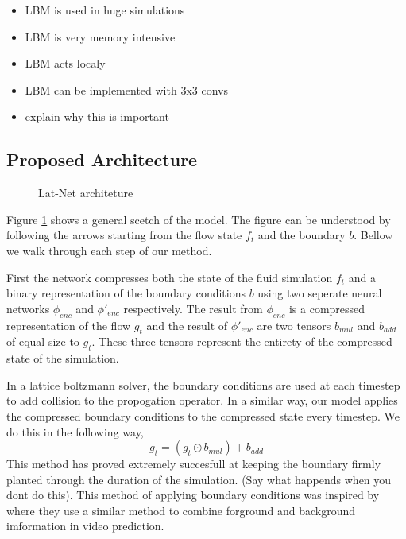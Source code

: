 \documentclass{article}
\begin{document}
\begin{itemize}
  \item LBM is used in huge simulations
  \item LBM is very memory intensive
  \item LBM acts localy
  \item LBM can be implemented with 3x3 convs
  \item explain why this is important
\end{itemize}

\subsection{Proposed Architecture}

\begin{figure}[!t]
\centering
{}
\caption{Lat-Net architeture }
\label{fig_1}
\end{figure}

Figure \ref{fig_1} shows a general scetch of the model. The figure can be understood by following the arrows starting from the flow state $f_t$ and the boundary $b$. Bellow we walk through each step of our method.

First the network compresses both the state of the fluid simulation $f_t$ and a binary representation of the boundary conditions $b$ using two seperate neural networks $\phi_{enc}$ and $\phi'_{enc}$ respectively. The result from $\phi_{enc}$ is a compressed representation of the flow $g_t$ and the result of $\phi'_{enc}$ are two tensors $b_{mul}$ and $b_{add}$ of equal size to $g_t$. These three tensors represent the entirety of the compressed state of the simulation.

In a lattice boltzmann solver, the boundary conditions are used at each timestep to add collision to the propogation operator. In a similar way, our model applies the compressed boundary conditions to the compressed state every timestep. We do this in the following way,
\begin{equation}
  g_t = (g_t \odot b_{mul}) + b_{add}
\end{equation}
This method has proved extremely succesfull at keeping the boundary firmly planted through the duration of the simulation. (Say what happends when you dont do this). This method of applying boundary conditions was inspired by\cite{vondrick2016generating} where they use a similar method to combine forground and background imformation in video prediction.
\end{document}
